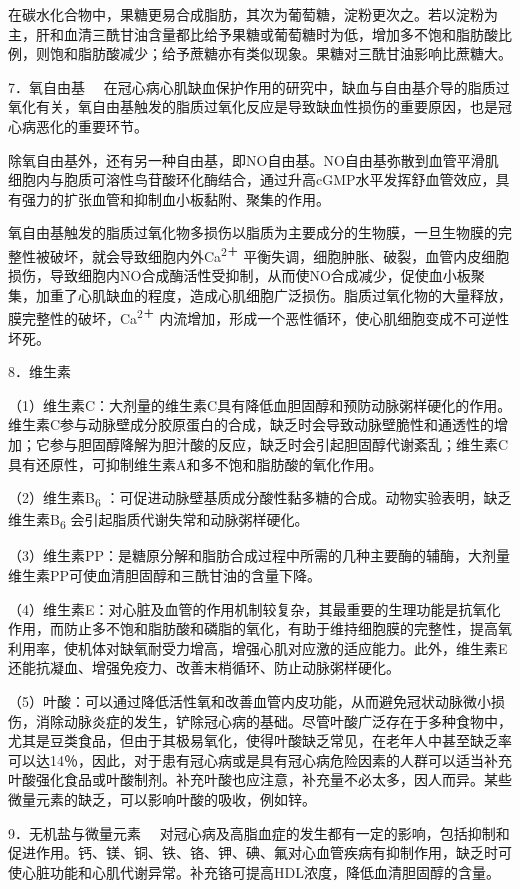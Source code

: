 在碳水化合物中，果糖更易合成脂肪，其次为葡萄糖，淀粉更次之。若以淀粉为主，肝和血清三酰甘油含量都比给予果糖或葡萄糖时为低，增加多不饱和脂肪酸比例，则饱和脂肪酸减少；给予蔗糖亦有类似现象。果糖对三酰甘油影响比蔗糖大。

{7．氧自由基}
　在冠心病心肌缺血保护作用的研究中，缺血与自由基介导的脂质过氧化有关，氧自由基触发的脂质过氧化反应是导致缺血性损伤的重要原因，也是冠心病恶化的重要环节。

除氧自由基外，还有另一种自由基，即NO自由基。NO自由基弥散到血管平滑肌细胞内与胞质可溶性鸟苷酸环化酶结合，通过升高cGMP水平发挥舒血管效应，具有强力的扩张血管和抑制血小板黏附、聚集的作用。

氧自由基触发的脂质过氧化物多损伤以脂质为主要成分的生物膜，一旦生物膜的完整性被破坏，就会导致细胞内外Ca\textsuperscript{2＋}
平衡失调，细胞肿胀、破裂，血管内皮细胞损伤，导致细胞内NO合成酶活性受抑制，从而使NO合成减少，促使血小板聚集，加重了心肌缺血的程度，造成心肌细胞广泛损伤。脂质过氧化物的大量释放，膜完整性的破坏，Ca\textsuperscript{2＋}
内流增加，形成一个恶性循环，使心肌细胞变成不可逆性坏死。

{8．维生素}

（1）维生素C：大剂量的维生素C具有降低血胆固醇和预防动脉粥样硬化的作用。维生素C参与动脉壁成分胶原蛋白的合成，缺乏时会导致动脉壁脆性和通透性的增加；它参与胆固醇降解为胆汁酸的反应，缺乏时会引起胆固醇代谢紊乱；维生素C具有还原性，可抑制维生素A和多不饱和脂肪酸的氧化作用。

（2）维生素B\textsubscript{6}
：可促进动脉壁基质成分酸性黏多糖的合成。动物实验表明，缺乏维生素B\textsubscript{6}
会引起脂质代谢失常和动脉粥样硬化。

（3）维生素PP：是糖原分解和脂肪合成过程中所需的几种主要酶的辅酶，大剂量维生素PP可使血清胆固醇和三酰甘油的含量下降。

（4）维生素E：对心脏及血管的作用机制较复杂，其最重要的生理功能是抗氧化作用，而防止多不饱和脂肪酸和磷脂的氧化，有助于维持细胞膜的完整性，提高氧利用率，使机体对缺氧耐受力增高，增强心肌对应激的适应能力。此外，维生素E还能抗凝血、增强免疫力、改善末梢循环、防止动脉粥样硬化。

（5）叶酸：可以通过降低活性氧和改善血管内皮功能，从而避免冠状动脉微小损伤，消除动脉炎症的发生，铲除冠心病的基础。尽管叶酸广泛存在于多种食物中，尤其是豆类食品，但由于其极易氧化，使得叶酸缺乏常见，在老年人中甚至缺乏率可以达14％，因此，对于患有冠心病或是具有冠心病危险因素的人群可以适当补充叶酸强化食品或叶酸制剂。补充叶酸也应注意，补充量不必太多，因人而异。某些微量元素的缺乏，可以影响叶酸的吸收，例如锌。

{9．无机盐与微量元素}
　对冠心病及高脂血症的发生都有一定的影响，包括抑制和促进作用。钙、镁、铜、铁、铬、钾、碘、氟对心血管疾病有抑制作用，缺乏时可使心脏功能和心肌代谢异常。补充铬可提高HDL浓度，降低血清胆固醇的含量。

